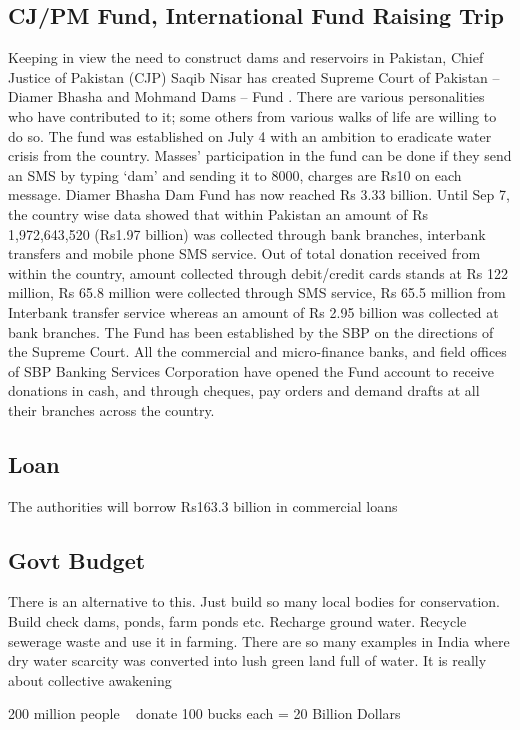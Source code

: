 \documentclass[11pt, journal,letterpaper,compsoc]{IEEEtran}
\begin{document}
\subsection{CJ/PM Fund, International Fund Raising Trip}
Keeping in view the need to construct dams and reservoirs in Pakistan, Chief Justice of Pakistan (CJP) Saqib Nisar has created  Supreme Court of Pakistan – Diamer Bhasha and Mohmand Dams – Fund . There are various personalities who have contributed to it; some others from various walks of life are willing to do so. The fund was established on July 4 with an ambition to eradicate water crisis from the country. Masses’ participation in the fund can be done if they send an SMS by typing ‘dam’ and sending it to 8000, charges are Rs10 on each message. Diamer Bhasha Dam Fund has now reached Rs 3.33 billion. Until Sep 7, the country wise data showed that within Pakistan an amount of Rs 1,972,643,520 (Rs1.97 billion) was collected through bank branches, interbank transfers and mobile phone SMS service. Out of total donation received from within the country, amount collected through debit/credit cards stands at Rs 122 million, Rs 65.8 million were collected through SMS service, Rs 65.5 million from Interbank transfer service whereas an amount of Rs 2.95 billion was collected at bank branches. The Fund has been established by the SBP on the directions of the Supreme Court. All the commercial and micro-finance banks, and field offices of SBP Banking Services Corporation have opened the Fund account to receive donations in cash, and through cheques, pay orders and demand drafts at all their branches across the country.

\subsection{Loan}
The authorities will borrow Rs163.3 billion in commercial loans

\subsection{Govt Budget}
There is an alternative to this. Just build so many local bodies for conservation. Build check dams, ponds, farm ponds etc. Recharge ground water. Recycle sewerage waste and use it in farming. There are so many examples in India where dry water scarcity was converted into lush green land full of water. It is really about collective awakening

200 million people ~ donate 100 bucks each = 20 Billion Dollars
\end{document}
